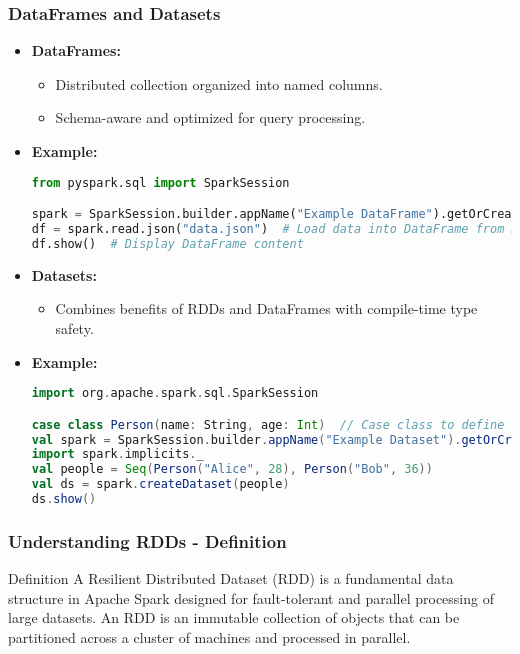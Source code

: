 \documentclass[aspectratio=169]{beamer}
\begin{document}
\begin{frame}[fragile]
    \frametitle{DataFrames and Datasets}
    \begin{itemize}
        \item \textbf{DataFrames:}
        \begin{itemize}
            \item Distributed collection organized into named columns.
            \item Schema-aware and optimized for query processing.
        \end{itemize}
        \item \textbf{Example:}
        \begin{lstlisting}[language=Python]
from pyspark.sql import SparkSession

spark = SparkSession.builder.appName("Example DataFrame").getOrCreate()
df = spark.read.json("data.json")  # Load data into DataFrame from JSON
df.show()  # Display DataFrame content
        \end{lstlisting}
        
        \item \textbf{Datasets:}
        \begin{itemize}
            \item Combines benefits of RDDs and DataFrames with compile-time type safety.
        \end{itemize}
        \item \textbf{Example:}
        \begin{lstlisting}[language=Scala]
import org.apache.spark.sql.SparkSession

case class Person(name: String, age: Int)  // Case class to define schema
val spark = SparkSession.builder.appName("Example Dataset").getOrCreate()
import spark.implicits._
val people = Seq(Person("Alice", 28), Person("Bob", 36))
val ds = spark.createDataset(people)
ds.show()
        \end{lstlisting}
    \end{itemize}
\end{frame}

\begin{frame}[fragile]
    \frametitle{Understanding RDDs - Definition}
    \begin{block}{Definition}
        A Resilient Distributed Dataset (RDD) is a fundamental data structure in Apache Spark designed for fault-tolerant and parallel processing of large datasets. An RDD is an immutable collection of objects that can be partitioned across a cluster of machines and processed in parallel.
    \end{block}
\end{frame}
\end{document}
